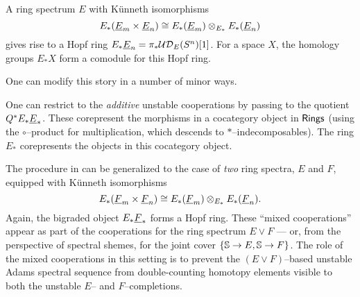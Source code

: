 \begin{remark}\label{HopfRingFromOneRingSpectrum}
A ring spectrum $E$ with K\"unneth isomorphisms \[E_*(\OS{E}{m} \times \OS{E}{n}) \cong E_*(\OS{E}{m}) \otimes_{E_*} E_*(\OS{E}{n})\] gives rise to a Hopf ring $E_* \OS{E}{n} = \pi_* \sheaf{UD}_E(S^n)[1]$.  For a space $X$, the homology groups $E_* X$ form a comodule for this Hopf ring.
\end{remark}

One can modify this story in a number of minor ways.

\begin{remark}
One can restrict to the \emph{additive} unstable cooperations by passing to the quotient $Q^\ast E_* \OS{E}{*}$.  These corepresent the morphisms in a cocategory object in $\CatOf{Rings}$ (using the $\circ$--product for multiplication, which descends to $\ast$--indecomposables).  The ring $E_*$ corepresents the objects in this cocategory object.
\end{remark}

\begin{remark}
The procedure in  can be generalized to the case of \emph{two} ring spectra, $E$ and $F$, equipped with K\"unneth isomorphisms \[E_*(\OS{F}{m} \times \OS{F}{n}) \cong E_*(\OS{F}{m}) \otimes_{E_*} E_*(\OS{F}{n}).\]  Again, the bigraded object $E_* \OS{F}{*}$ forms a Hopf ring.  These ``mixed cooperations'' appear as part of the cooperations for the ring spectrum $E \vee F$ --- or, from the perspective of spectral shemes, for the joint cover $\{\S \to E, \S \to F\}$.  The role of the mixed cooperations in this setting is to prevent the $(E \vee F)$--based unstable Adams spectral sequence from double-counting homotopy elements visible to both the unstable $E$-- and $F$--completions.
\end{remark}






